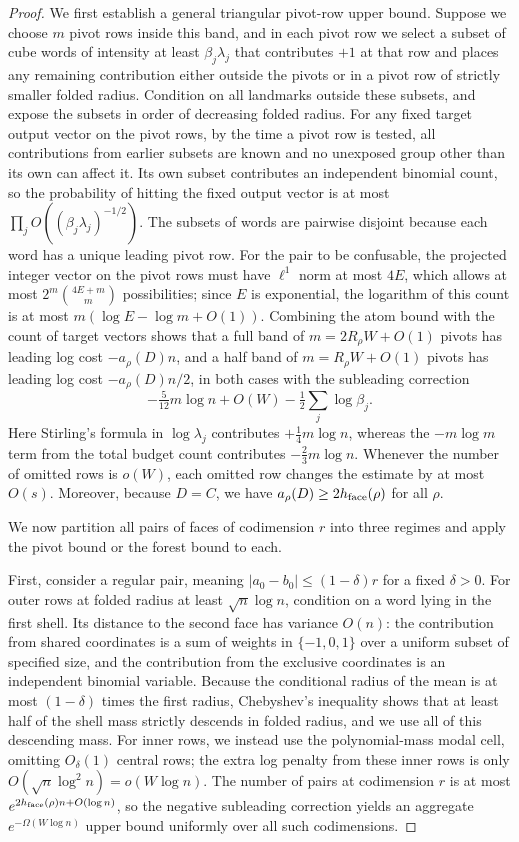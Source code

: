 \begin{proof}
We first establish a general triangular pivot-row upper bound. Suppose we choose \(m\) pivot rows inside this band, and in each pivot row we select a subset of cube words of intensity at least \(\beta_j\lambda_j\) that contributes \(+1\) at that row and places any remaining contribution either outside the pivots or in a pivot row of strictly smaller folded radius. Condition on all landmarks outside these subsets, and expose the subsets in order of decreasing folded radius. For any fixed target output vector on the pivot rows, by the time a pivot row is tested, all contributions from earlier subsets are known and no unexposed group other than its own can affect it. Its own subset contributes an independent binomial count, so the probability of hitting the fixed output vector is at most \(\prod_j O((\beta_j\lambda_j)^{-1/2})\). The subsets of words are pairwise disjoint because each word has a unique leading pivot row. For the pair to be confusable, the projected integer vector on the pivot rows must have \(\ell^1\) norm at most \(4E\), which allows at most \(2^m\binom{4E+m}{m}\) possibilities; since \(E\) is exponential, the logarithm of this count is at most \(m(\log E-\log m+O(1))\). Combining the atom bound with the count of target vectors shows that a full band of \(m=2R_\rho W+O(1)\) pivots has leading log cost \(-a_\rho(D)n\), and a half band of \(m=R_\rho W+O(1)\) pivots has leading log cost \(-a_\rho(D)n/2\), in both cases with the subleading correction
\[
 -\tfrac5{12}m\log n+O(W)-\tfrac12\sum_j\log\beta_j.
\]
Here Stirling's formula in \(\log\lambda_j\) contributes \(+\tfrac14 m\log n\), whereas the \(-m\log m\) term from the total budget count contributes \(-\tfrac23 m\log n\). Whenever the number of omitted rows is \(o(W)\), each omitted row changes the estimate by at most \(O(s)\). Moreover, because \(D=C\), we have \(a_\rho(D)\ge2h_{\rm face}(\rho)\) for all \(\rho\).

We now partition all pairs of faces of codimension \(r\) into three regimes and apply the pivot bound or the forest bound to each.

First, consider a regular pair, meaning \(|a_0-b_0|\le(1-\delta)r\) for a fixed \(\delta>0\). For outer rows at folded radius at least \(\sqrt n\log n\), condition on a word lying in the first shell. Its distance to the second face has variance \(O(n)\): the contribution from shared coordinates is a sum of weights in \(\{-1,0,1\}\) over a uniform subset of specified size, and the contribution from the exclusive coordinates is an independent binomial variable. Because the conditional radius of the mean is at most \((1-\delta)\) times the first radius, Chebyshev's inequality shows that at least half of the shell mass strictly descends in folded radius, and we use all of this descending mass. For inner rows, we instead use the polynomial-mass modal cell, omitting \(O_\delta(1)\) central rows; the extra log penalty from these inner rows is only \(O(\sqrt n\log^2 n)=o(W\log n)\). The number of pairs at codimension \(r\) is at most \(e^{2h_{\rm face}(\rho)n+O(\log n)}\), so the negative subleading correction yields an aggregate \(e^{-\Omega(W\log n)}\) upper bound uniformly over all such codimensions.


\end{proof}
